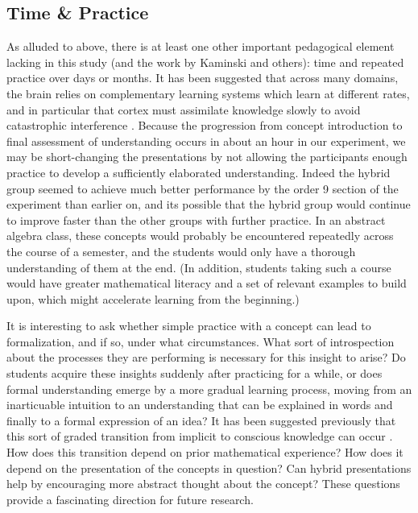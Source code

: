 \documentclass[man,mask,10pt]{apa6}
\begin{document}
\subsection{Time \& Practice}
As alluded to above, there is at least one other important pedagogical element lacking in this study (and the work by Kaminski and others): time and repeated practice over days or months. It has been suggested that across many domains, the brain relies on complementary learning systems which learn at different rates, and in particular that cortex must assimilate knowledge slowly to avoid catastrophic interference \cite{Kumaran2016}. Because the progression from concept introduction to final assessment of understanding occurs in about an hour in our experiment, we may be short-changing the presentations by not allowing the participants enough practice to develop a sufficiently elaborated understanding. Indeed the hybrid group seemed to achieve much better performance by the order 9 section of the experiment than earlier on, and its possible that the hybrid group would continue to improve faster than the other groups with further practice. In an abstract algebra class, these concepts would probably be encountered repeatedly across the course of a semester, and the students would only have a thorough understanding of them at the end. (In addition, students taking such a course would have greater mathematical literacy and a set of relevant examples to build upon, which might accelerate learning from the beginning.)\par
It is interesting to ask whether simple practice with a concept can lead to formalization, and if so, under what circumstances. What sort of introspection about the processes they are performing is necessary for this insight to arise? Do students acquire these insights suddenly after practicing for a while, or does formal understanding emerge by a more gradual learning process, moving from an inarticuable intuition to an understanding that can be explained in words and finally to a formal expression of an idea? It has been suggested previously that this sort of graded transition from implicit to conscious knowledge can occur \cite{Cleeremans2002}. How does this transition depend on prior mathematical experience? How does it depend on the presentation of the concepts in question? Can hybrid presentations help by encouraging more abstract thought about the concept? These questions provide a fascinating direction for future research. 
\end{document}
